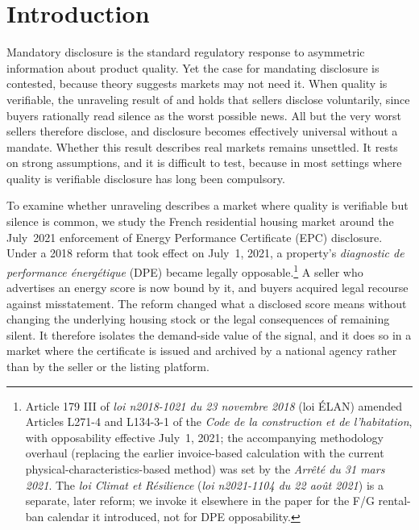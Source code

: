 
\section{Introduction}
\label{sec:intro}

Mandatory disclosure is the standard regulatory response to asymmetric information about
product quality. Yet the case for mandating disclosure is contested, because theory suggests
markets may not need it. When quality is verifiable, the unraveling result of
\citet{grossman_informational_1981} and \citet{milgrom_good_1981} holds that sellers disclose
voluntarily, since buyers rationally read silence as the worst possible news. All but the very
worst sellers therefore disclose, and disclosure becomes effectively universal without a
mandate. Whether this result describes real markets remains unsettled. It rests on strong
assumptions, and it is difficult to test, because in most settings where quality is verifiable
disclosure has long been compulsory.

To examine whether unraveling describes a market where quality is verifiable but silence is
common, we study the French residential housing market around the July~2021 enforcement of
Energy Performance Certificate (EPC) disclosure. Under a 2018 reform that took effect on
July~1, 2021, a property's \emph{diagnostic de performance \'energ\'etique} (DPE) became
legally opposable.\footnote{Article 179 III of \emph{loi n\textdegree{}2018-1021 du 23 novembre
2018} (loi \'ELAN) amended Articles L271-4 and L134-3-1 of the \emph{Code de la construction et
de l'habitation}, with opposability effective July~1, 2021; the accompanying methodology
overhaul (replacing the earlier invoice-based calculation with the current
physical-characteristics-based method) was set by the \emph{Arr\^et\'e du 31 mars 2021}. The
\emph{loi Climat et R\'esilience} (\emph{loi n\textdegree{}2021-1104 du 22 ao\^ut 2021}) is a
separate, later reform; we invoke it elsewhere in the paper for the F/G rental-ban calendar it
introduced, not for DPE opposability.} A seller who advertises an energy score is now bound by
it, and buyers acquired legal recourse against misstatement. The reform changed what a disclosed
score means without changing the underlying housing stock or the legal consequences of remaining
silent. It therefore isolates the demand-side value of the signal, and it does so in a market
where the certificate is issued and archived by a national agency rather than by the seller or
the listing platform.

